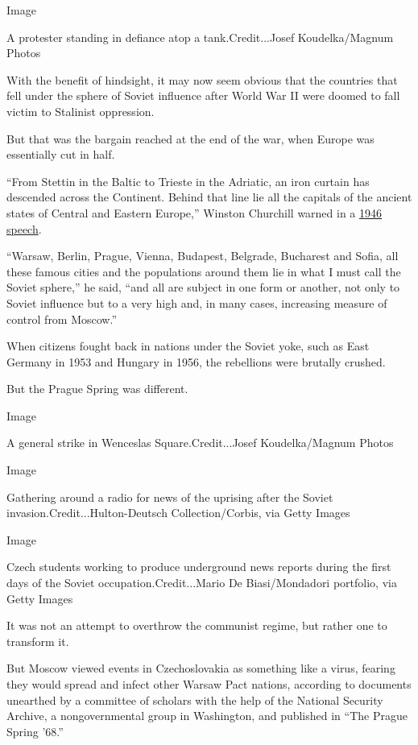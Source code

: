 Image

A protester standing in defiance atop a tank.Credit...Josef
Koudelka/Magnum Photos

With the benefit of hindsight, it may now seem obvious that the
countries that fell under the sphere of Soviet influence after World War
II were doomed to fall victim to Stalinist oppression.

But that was the bargain reached at the end of the war, when Europe was
essentially cut in half.

``From Stettin in the Baltic to Trieste in the Adriatic, an iron curtain
has descended across the Continent. Behind that line lie all the
capitals of the ancient states of Central and Eastern Europe,'' Winston
Churchill warned in a
\href{https://winstonchurchill.org/resources/speeches/1946-1963-elder-statesman/the-sinews-of-peace/}{1946
speech}.

``Warsaw, Berlin, Prague, Vienna, Budapest, Belgrade, Bucharest and
Sofia, all these famous cities and the populations around them lie in
what I must call the Soviet sphere,'' he said, ``and all are subject in
one form or another, not only to Soviet influence but to a very high
and, in many cases, increasing measure of control from Moscow.''

When citizens fought back in nations under the Soviet yoke, such as East
Germany in 1953 and Hungary in 1956, the rebellions were brutally
crushed.

But the Prague Spring was different.

Image

A general strike in Wenceslas Square.Credit...Josef Koudelka/Magnum
Photos

Image

Gathering around a radio for news of the uprising after the Soviet
invasion.Credit...Hulton-Deutsch Collection/Corbis, via Getty Images

Image

Czech students working to produce underground news reports during the
first days of the Soviet occupation.Credit...Mario De Biasi/Mondadori
portfolio, via Getty Images

It was not an attempt to overthrow the communist regime, but rather one
to transform it.

But Moscow viewed events in Czechoslovakia as something like a virus,
fearing they would spread and infect other Warsaw Pact nations,
according to documents unearthed by a committee of scholars with the
help of the National Security Archive, a nongovernmental group in
Washington, and published in ``The Prague Spring '68.''

